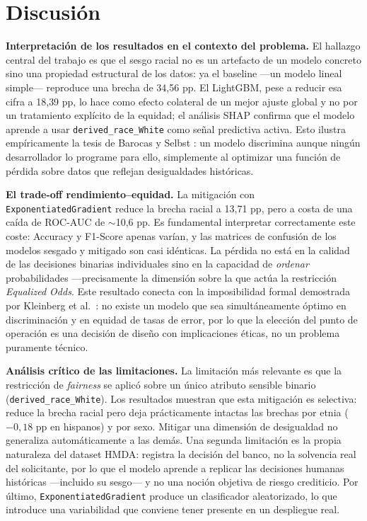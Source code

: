 \documentclass[11pt,a4paper]{article}
\begin{document}
\section{Discusión}
\label{sec:discusion}

\textbf{Interpretación de los resultados en el contexto del problema.} El hallazgo central del
trabajo es que el sesgo racial no es un artefacto de un modelo concreto sino una propiedad
estructural de los datos: ya el baseline ---un modelo lineal simple--- reproduce una brecha de
34{,}56 pp. El LightGBM, pese a reducir esa cifra a 18{,}39 pp, lo hace como efecto colateral de
un mejor ajuste global y no por un tratamiento explícito de la equidad; el análisis SHAP confirma
que el modelo aprende a usar \texttt{derived\_race\_White} como señal predictiva activa. Esto
ilustra empíricamente la tesis de Barocas y Selbst \cite{barocas2016}: un modelo discrimina aunque
ningún desarrollador lo programe para ello, simplemente al optimizar una función de pérdida sobre
datos que reflejan desigualdades históricas.

\textbf{El trade-off rendimiento--equidad.} La mitigación con \texttt{ExponentiatedGradient} reduce
la brecha racial a 13{,}71 pp, pero a costa de una caída de ROC-AUC de $\sim$10{,}6 pp. Es
fundamental interpretar correctamente este coste: Accuracy y F1-Score apenas varían, y las matrices
de confusión de los modelos sesgado y mitigado son casi idénticas. La pérdida no está en la calidad
de las decisiones binarias individuales sino en la capacidad de \textit{ordenar} probabilidades
---precisamente la dimensión sobre la que actúa la restricción \textit{Equalized Odds}. Este
resultado conecta con la imposibilidad formal demostrada por Kleinberg et al.\ \cite{kleinberg2017}:
no existe un modelo que sea simultáneamente óptimo en discriminación y en equidad de tasas de error,
por lo que la elección del punto de operación es una decisión de diseño con implicaciones éticas,
no un problema puramente técnico.

\textbf{Análisis crítico de las limitaciones.} La limitación más relevante es que la restricción de
\textit{fairness} se aplicó sobre un único atributo sensible binario (\texttt{derived\_race\_White}).
Los resultados muestran que esta mitigación es selectiva: reduce la brecha racial pero deja
prácticamente intactas las brechas por etnia ($-0{,}18$ pp en hispanos) y por sexo. Mitigar una
dimensión de desigualdad no generaliza automáticamente a las demás. Una segunda limitación es la
propia naturaleza del dataset HMDA: registra la decisión del banco, no la solvencia real del
solicitante, por lo que el modelo aprende a replicar las decisiones humanas históricas ---incluido
su sesgo--- y no una noción objetiva de riesgo crediticio. Por último, \texttt{ExponentiatedGradient}
produce un clasificador aleatorizado, lo que introduce una variabilidad que conviene tener presente
en un despliegue real.
\end{document}
